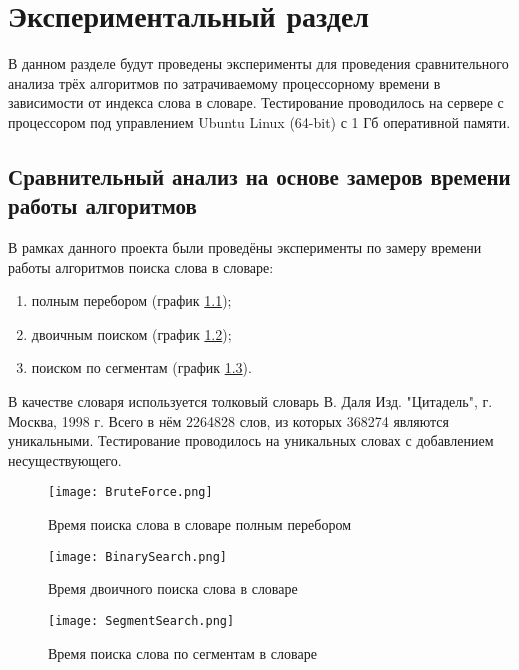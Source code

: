 \chapter{Экспериментальный раздел}
\label{cha:research}
    В данном разделе будут проведены эксперименты для проведения 
    сравнительного анализа трёх алгоритмов по затрачиваемому процессорному 
    времени в зависимости от индекса слова в словаре.
    Тестирование проводилось на сервере с процессором
    под управлением Ubuntu Linux (64-bit) с 1 Гб оперативной памяти.

    \section{Сравнительный анализ на основе замеров времени работы алгоритмов}
        В рамках данного проекта были проведёны эксперименты
        по замеру времени работы алгоритмов поиска слова в словаре:
        \begin{enumerate}
            \item полным перебором (график \ref{graph:test:brute-force});
            \item двоичным поиском (график \ref{graph:test:binary});
            \item поиском по сегментам (график \ref{graph:test:segment}).
        \end{enumerate}

        В качестве словаря используется толковый словарь В. Даля Изд. "Цитадель", г. Москва, 1998 г.
        Всего в нём 2264828 слов, из которых 368274 являются уникальными. 
        Тестирование проводилось на уникальных словах с добавлением несуществующего.

        \begin{figure}[h!]
            \centering
                \texttt{[image: BruteForce.png]}
                \caption{Время поиска слова в словаре полным перебором}
                \label{graph:test:brute-force}
        \end{figure}


        
        \begin{figure}[h!]
            \centering
                \texttt{[image: BinarySearch.png]}
                \caption{Время двоичного поиска слова в словаре}
                \label{graph:test:binary}
        \end{figure}

        \begin{figure}[h!]
            \centering
                \texttt{[image: SegmentSearch.png]}
                \caption{Время поиска слова по сегментам в словаре}
                \label{graph:test:segment}
        \end{figure}


